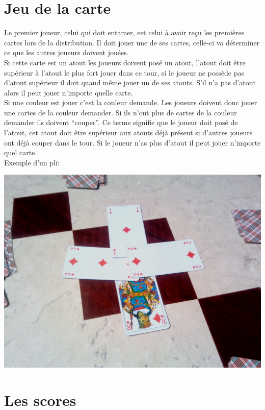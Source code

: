 \documentclass[a4paper]{report}
\begin{document}
	\section{Jeu de la carte}
		Le premier joueur, celui qui doit entamer, est celui à avoir reçu les premières cartes lors de la distribution.
Il doit jouer une de ses cartes, celle-ci va déterminer ce que les autres joueurs doivent jouées.\\
Si cette carte est un atout les joueurs doivent posé un atout, l’atout doit être supérieur à l’atout le plus fort jouer dans ce tour, si le joueur ne possède pas d’atout supérieur il doit quand même jouer un de ses atouts. S’il n’a pas d’atout alors il peut jouer n’importe quelle carte.\\
Si une couleur est jouer c’est la couleur demande. Les joueurs doivent donc jouer une cartes de la couleur demander. Si ils n’ont plus de cartes de la couleur demander ils doivent “couper”. Ce terme signifie que le joueur doit posé de l’atout, cet atout doit être supérieur aux atouts déjà présent si d’autres joueurs ont déjà couper dans le tour. Si le joueur n’as plus d’atout il peut jouer n’importe quel carte.\\
		Exemple d'un pli:
			\begin{center}
				\includegraphics[scale=0.15]{Images/2.jpg}
			\end{center}


	\section{Les scores}
		
\end{document}
